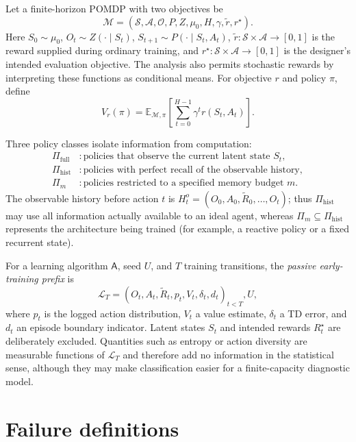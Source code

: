 \documentclass[9pt,twocolumn]{extarticle}
\newcommand{\E}{\mathbb{E}}
\newcommand{\rtrue}{r^{\star}}
\newcommand{\rproxy}{\widetilde r}
\newcommand{\Dpre}{\mathcal{L}_{T}}
\newcommand{\PiFull}{\Pi_{\mathrm{full}}}
\newcommand{\PiHist}{\Pi_{\mathrm{hist}}}
\newcommand{\PiMem}{\Pi_{m}}
\begin{document}
Let a finite-horizon POMDP with two objectives be
\begin{equation}
\mathcal M=(\mathcal S,\mathcal A,\mathcal O,P,Z,\mu_0,H,
\gamma,\rproxy,\rtrue).
\end{equation}
Here $S_0\sim\mu_0$, $O_t\sim Z(\cdot\mid S_t)$,
$S_{t+1}\sim P(\cdot\mid S_t,A_t)$, $\rproxy:\mathcal
S\times\mathcal A\to[0,1]$ is the reward supplied during ordinary training,
and $\rtrue:\mathcal S\times\mathcal A\to[0,1]$ is the designer's intended
evaluation objective. The analysis also permits stochastic rewards by
interpreting these functions as conditional means. For objective $r$ and
policy $\pi$, define
\begin{equation}
V_r(\pi)=\E_{\mathcal M,\pi}\!\left[\sum_{t=0}^{H-1}
\gamma^t r(S_t,A_t)\right].
\end{equation}

Three policy classes isolate information from computation:
\begin{align*}
\PiFull &: \text{policies that observe the current latent state }S_t,\\
\PiHist &: \text{policies with perfect recall of the observable history},\\
\PiMem &: \text{policies restricted to a specified memory budget }m.
\end{align*}
The observable history before action $t$ is
$H_t^o=(O_0,A_0,\widetilde R_0,\ldots,O_t)$; thus $\PiHist$ may use all
information actually available to an ideal agent, whereas $\PiMem\subseteq
\PiHist$ represents the architecture being trained (for example, a reactive
policy or a fixed recurrent state).

For a learning algorithm $\mathsf A$, seed $U$, and $T$ training transitions,
the \emph{passive early-training prefix} is
\begin{equation}
\Dpre=(O_t,A_t,\widetilde R_t,p_t,V_t,\delta_t,d_t)_{t<T},U,
\end{equation}
where $p_t$ is the logged action distribution, $V_t$ a value estimate,
$\delta_t$ a TD error, and $d_t$ an episode boundary indicator. Latent states
$S_t$ and intended rewards $R_t^\star$ are deliberately excluded. Quantities
such as entropy or action diversity are measurable functions of $\Dpre$ and
therefore add no information in the statistical sense, although they may make
classification easier for a finite-capacity diagnostic model.

\section{Failure definitions}
\end{document}
